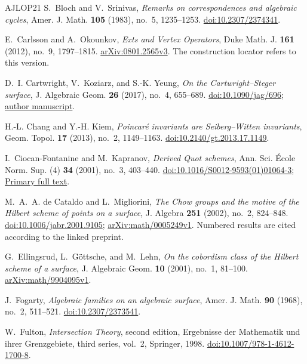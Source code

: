 \begin{thebibliography}{AJLOP21}
S.~Bloch and V.~Srinivas,
\emph{Remarks on correspondences and algebraic cycles},
Amer. J. Math. \textbf{105} (1983), no.~5, 1235--1253.
\href{https://doi.org/10.2307/2374341}{doi:10.2307/2374341}.

E.~Carlsson and A.~Okounkov,
\emph{Exts and Vertex Operators},
Duke Math. J. \textbf{161} (2012), no.~9, 1797--1815.
\href{https://arxiv.org/abs/0801.2565v3}{arXiv:0801.2565v3}.
The construction locator refers to this version.

D.~I. Cartwright, V.~Koziarz, and S.-K. Yeung,
\emph{On the Cartwright--Steger surface},
J. Algebraic Geom. \textbf{26} (2017), no.~4, 655--689.
\href{https://doi.org/10.1090/jag/696}{doi:10.1090/jag/696};
\href{https://www.maths.usyd.edu.au/u/donaldc/cs-surface/cs-surface.pdf}{author manuscript}.

H.-L. Chang and Y.-H. Kiem,
\emph{Poincar\'e invariants are Seiberg--Witten invariants},
Geom. Topol. \textbf{17} (2013), no.~2, 1149--1163.
\href{https://doi.org/10.2140/gt.2013.17.1149}{doi:10.2140/gt.2013.17.1149}.

I.~Ciocan-Fontanine and M.~Kapranov,
\emph{Derived Quot schemes},
Ann. Sci. \'Ecole Norm. Sup. (4) \textbf{34} (2001), no.~3, 403--440.
\href{https://doi.org/10.1016/S0012-9593(01)01064-3}{doi:10.1016/S0012-9593(01)01064-3};
\href{https://www.numdam.org/item/ASENS_2001_4_34_3_403_0.pdf}{Primary full text}.

M.~A.~A. de Cataldo and L.~Migliorini,
\emph{The Chow groups and the motive of the Hilbert scheme of points on a surface},
J. Algebra \textbf{251} (2002), no.~2, 824--848.
\href{https://doi.org/10.1006/jabr.2001.9105}{doi:10.1006/jabr.2001.9105};
\href{https://arxiv.org/abs/math/0005249v1}{arXiv:math/0005249v1}.
Numbered results are cited according to the linked preprint.

G.~Ellingsrud, L.~G\"ottsche, and M.~Lehn,
\emph{On the cobordism class of the Hilbert scheme of a surface},
J. Algebraic Geom. \textbf{10} (2001), no.~1, 81--100.
\href{https://arxiv.org/abs/math/9904095v1}{arXiv:math/9904095v1}.

J.~Fogarty, \emph{Algebraic families on an algebraic surface},
Amer. J. Math. \textbf{90} (1968), no.~2, 511--521.
\href{https://doi.org/10.2307/2373541}{doi:10.2307/2373541}.

W.~Fulton, \emph{Intersection Theory}, second edition,
Ergebnisse der Mathematik und ihrer Grenzgebiete, third series, vol.~2,
Springer, 1998.
\href{https://doi.org/10.1007/978-1-4612-1700-8}{doi:10.1007/978-1-4612-1700-8}.


\end{thebibliography}
